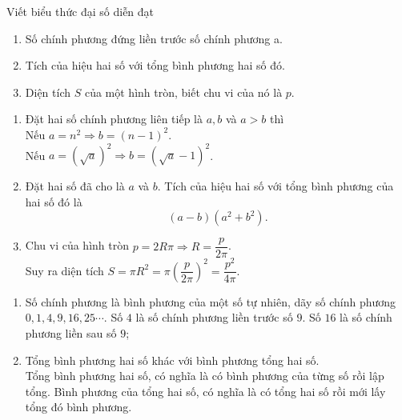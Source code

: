 \begin{vd}%
	Viết biểu thức đại số diễn đạt
	\begin{enumerate}
		\item Số chính phương đứng liền trước số chính phương a.
		\item Tích của hiệu hai số với tổng bình phương hai số đó.
		\item Diện tích $S$ của một hình tròn, biết chu vi của nó là $p$.
	\end{enumerate}
	\loigiai
	{
		\begin{enumerate}
			\item Đặt hai số chính phương liên tiếp là $a,b$ và $a>b$ thì\\
			Nếu $a=n^2 \Rightarrow b = (n-1)^2$.\\
			Nếu $a = \left(\sqrt{a}\right) ^2 \Rightarrow b = \left( \sqrt{a} -1 \right)^2 $.
			\item Đặt hai số đã cho là $a$ và $b$. Tích của hiệu hai số với tổng bình phương của hai số đó là 
			$$\left(a-b\right) \left(a^2+b^2\right).$$
			\item Chu vi của hình tròn $p=2R \pi \Rightarrow R =\dfrac{p}{2 \pi }$.\\
			Suy ra diện tích $S = \pi R^2 =\pi \left(\dfrac{p}{2\pi}\right)^2 = \dfrac{p^2}{4 \pi}$.
		\end{enumerate}
	}
\end{vd}

\begin{note}
	\begin{enumerate}
		\item Số chính phương là bình phương của một số tự nhiên, dãy số chính phương $0,1,4,9,16,25 \cdots$. Số $4$ là số chính phương liền trước số $9$. Số $16$ là số chính phương liền sau số $9$;
		\item Tổng bình phương hai số khác với bình phương tổng hai số.\\
		Tổng bình phương hai số, có nghĩa là có bình phương của từng số rồi lập tổng.
		Bình phương của tổng hai số, có nghĩa là có tổng hai số rồi mới lấy tổng đó bình phương.
	\end{enumerate}
\end{note}

